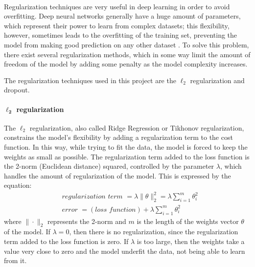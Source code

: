 \paragraph{} Regularization techniques are very useful in deep learning in order to avoid overfitting. Deep neural networks generally have a huge amount of parameters, which represent their power to learn from complex datasets; this flexibility, however, sometimes leads to the overfitting of the training set, preventing the model from making good prediction on any other dataset \cite{OReilly:handsonML}. To solve this problem, there exist several regularization methods, which in some way limit the amount of freedom of the model by adding some penalty as the model complexity increases.

The regularization techniques used in this project are the $\ell_{2}$ regularization and dropout.

\paragraph{$\mathbf{\ell_2}$ regularization} The $\ell_2$ regularization, also called Ridge Regression or Tikhonov regularization, constrains the model's flexibility by adding a regularization term to the cost function. In this way, while trying to fit the data, the model is forced to keep the weights as small as possible. The regularization term added to the loss function is the 2-norm (Euclidean distance) squared, controlled by the parameter $\lambda$, which handles the amount of regularization of the model. This is expressed by the equation:
\begin{align}
    &\textit{regularization term } = \lambda \|\theta\|_{2}^{2} = 
    \lambda \sum_{i=1}^{m} \theta_{i}^{2}\\
    &\textit{error } = (\textit{loss function}) + \lambda \sum_{i=1}^{m} \theta_{i}^{2}
\end{align}
where $\|\cdot\|_{2}$ represents the 2-norm and $m$ is the length of the weights vector $\theta$ of the model. If $\lambda = 0$, then there is no regularization, since the regularization term added to the loss function is zero. If $\lambda$ is too large, then the weights take a value very close to zero and the model underfit the data, not being able to learn from it.

